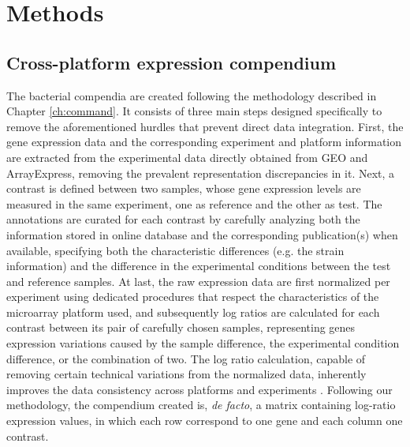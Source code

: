 \section{Methods}


\subsection{Cross-platform expression compendium} 
\label{sec:colombos-comp-method}


The bacterial compendia are created following the methodology described in 
Chapter \ref{ch:command}.
It consists of three main steps designed specifically to remove the 
aforementioned hurdles that prevent direct data integration.
First, the gene expression data and the corresponding experiment and platform 
information are extracted from the experimental data directly obtained from 
GEO and ArrayExpress, removing the prevalent representation discrepancies in it.
%
Next, a contrast is defined between two samples, whose gene expression levels 
are measured in the same experiment, one as reference and the other as test.
The annotations are curated for each contrast by carefully analyzing both the 
information stored in online database and the corresponding publication(s) when 
available, specifying both the characteristic differences (e.g. the strain 
information) and the difference in the experimental conditions between the test 
and reference samples.
%
At last, the raw expression data are first normalized per experiment using 
dedicated procedures that respect the characteristics of the microarray 
platform used, and subsequently log ratios are calculated for each contrast 
between its pair of carefully chosen samples, representing genes expression 
variations caused by the sample difference, the experimental condition 
difference, or the combination of two.
The log ratio calculation, capable of removing certain technical variations 
from the normalized data, inherently improves the data consistency across 
platforms and experiments \cite{Shi2006, Shi2008}.
%
Following our methodology, the compendium created is, \textit{de facto}, a 
matrix containing log-ratio expression values, in which each row correspond to 
one gene and each column one contrast.




